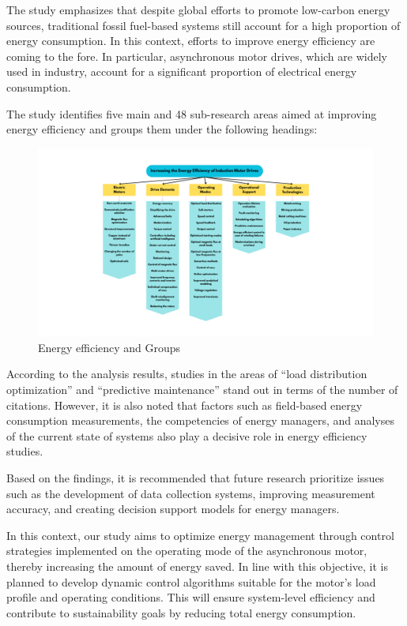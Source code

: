 The study emphasizes that despite global efforts to promote low-carbon energy sources, traditional fossil fuel-based systems still account for a high proportion of energy consumption. In this context, efforts to improve energy efficiency are coming to the fore. In particular, asynchronous motor drives, which are widely used in industry, account for a significant proportion of electrical energy consumption.

The study identifies five main and 48 sub-research areas aimed at improving energy efficiency and groups them under the following headings:

\begin{figure}[H]
    \centering
     \includegraphics[width=0.8\columnwidth]{imgs/Optimal load distribution (1)} 
    \caption[Short description for list of figures]{Energy efficiency and Groups }
    \label{fig-magnitude}
    \end{figure}%

    


According to the analysis results, studies in the areas of “load distribution optimization” and “predictive maintenance” stand out in terms of the number of citations. However, it is also noted that factors such as field-based energy consumption measurements, the competencies of energy managers, and analyses of the current state of systems also play a decisive role in energy efficiency studies.

Based on the findings, it is recommended that future research prioritize issues such as the development of data collection systems, improving measurement accuracy, and creating decision support models for energy managers.

In this context, our study aims to optimize energy management through control strategies implemented on the operating mode of the asynchronous motor, thereby increasing the amount of energy saved. In line with this objective, it is planned to develop dynamic control algorithms suitable for the motor's load profile and operating conditions. This will ensure system-level efficiency and contribute to sustainability goals by reducing total energy consumption.


